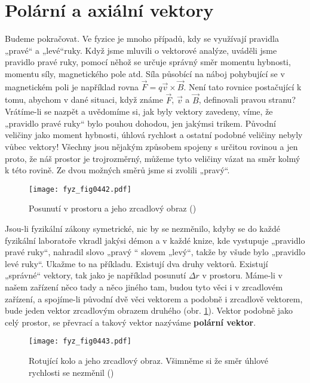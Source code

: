   \section{Polární a axiální vektory}\label{fyz:IchapLIIsecV}
    Budeme pokračovat. Ve fyzice je mnoho případů, kdy se využívají pravidla „pravé“ a „levé“ruky.
    Když jsme mluvili o vektorové analýze, uváděli jsme pravidlo pravé ruky, pomocí něhož se určuje
    správný směr momentu hybnosti, momentu síly, magnetického pole atd. Síla působící na náboj
    pohybující se v magnetickém poli je například rovna \(\vec{F} = q \vec{v}\times\vec{B}\). Není
    tato rovnice postačující k tomu, abychom v dané situaci, když známe \(\vec{F}\), \(\vec{v}\) a
    \(\vec{B}\), deﬁnovali pravou stranu? Vrátíme-li se nazpět a uvědomíme si, jak byly vektory
    zavedeny, víme, že „pravidlo pravé ruky“ bylo pouhou dohodou, jen jakýmsi trikem. Původní
    veličiny jako moment hybnosti, úhlová rychlost a ostatní podobné veličiny nebyly vůbec vektory!
    Všechny jsou nějakým způsobem spojeny s určitou rovinou a jen proto, že náš prostor je
    trojrozměrný, můžeme tyto veličiny vázat na směr kolmý k této rovině. Ze dvou možných směrů jsme
    si zvolili „pravý“.

    \begin{figure}[ht!] %
      \centering
      \texttt{[image: fyz\_fig0442.pdf]}
      \caption{Posunutí v prostoru a jeho zrcadlový obraz (\cite[s.~706]{Feynman01})}
      \label{fyz:fig0442}
    \end{figure}

    Jsou-li fyzikální zákony symetrické, nic by se nezměnilo, kdyby se do každé fyzikální laboratoře
    vkradl jakýsi démon a v každé knize, kde vystupuje „pravidlo pravé ruky“, nahradil slovo „pravý
    “ slovem „levý“, takže by všude bylo „pravidlo levé ruky“. Ukažme to na příkladu. Existují dva
    druhy vektorů. Existují „správné“ vektory, tak jako je například posunutí \(\Delta r\) v
    prostoru. Máme-li v našem zařízení něco tady a něco jiného tam, budou tyto věci i v zrcadlovém
    zařízení, a spojíme-li původní dvě věci vektorem a podobně i zrcadlově vektorem, bude jeden
    vektor zrcadlovým obrazem druhého (obr. \ref{fyz:fig0442}). Vektor podobně jako celý prostor, se
    převrací a takový vektor nazýváme \textbf{polární vektor}.

    \begin{figure}[ht!] %
      \centering
      \texttt{[image: fyz\_fig0443.pdf]}
      \caption{Rotující kolo a jeho zrcadlový obraz. Všimněme si že směr  úhlové 
               rychlosti se nezměnil (\cite[s.~706]{Feynman01})}
      \label{fyz:fig0443}
    \end{figure}

